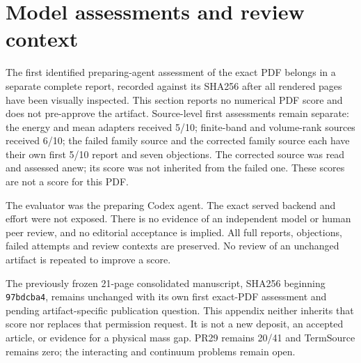 \documentclass[11pt]{article}
\begin{document}
\section{Model assessments and review context}
The first identified preparing-agent assessment of the exact PDF belongs
in a separate complete report, recorded against its SHA256 after all
rendered pages have been visually inspected. This section reports no
numerical PDF score and does not pre-approve the artifact. Source-level first
assessments remain separate: the energy and mean adapters received 5/10;
finite-band and volume-rank sources received 6/10; the failed family source
and the corrected family source each have
their own first 5/10 report and seven objections. The corrected source was
read and assessed anew; its score was not inherited from the failed one.
These scores are not a score for this PDF.

The evaluator was the preparing Codex agent. The exact served backend and
effort were not exposed. There is no evidence of an independent model or
human peer review, and no editorial acceptance is implied. All full reports,
objections, failed attempts and review contexts are preserved. No review
of an unchanged artifact is repeated to improve a score.

The previously frozen 21-page consolidated manuscript, SHA256 beginning
\texttt{97bdcba4}, remains unchanged with its own first exact-PDF assessment
and pending artifact-specific publication question. This appendix neither
inherits that score nor replaces that permission request. It is not a new
deposit, an accepted article, or evidence for a physical mass gap. PR29
remains 20/41 and TermSource remains zero; the interacting and continuum
problems remain open.
\end{document}
